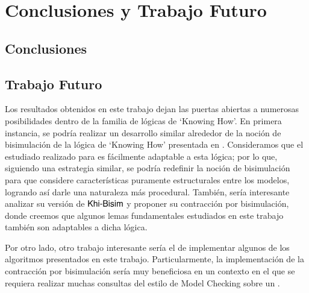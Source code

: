 \chapter{Conclusiones y Trabajo Futuro}

\section{Conclusiones}


\section{Trabajo Futuro}

Los resultados obtenidos en este trabajo dejan las puertas abiertas a numerosas posibilidades dentro de la familia de lógicas de `Knowing How'. 
En primera instancia, se podría realizar un desarrollo similar alrededor de la noción de bisimulación de la lógica de `Knowing How' presentada 
en \cite{Wang15KH,Wang2018GoalDirectedKH}. Consideramos que el estudiado realizado para \KHilogic es fácilmente adaptable a esta lógica; por lo que, siguiendo 
una estrategia similar, se podría redefinir la noción de bisimulación para que considere características puramente estructurales entre los modelos, 
logrando así darle una naturaleza más procedural. También, sería interesante analizar su versión de $\rm\textsf{Khi-Bisim}$ y proponer su contracción 
por bisimulación, donde creemos que algunos lemas fundamentales estudiados en este trabajo también son adaptables a dicha lógica.

Por otro lado, otro trabajo interesante sería el de implementar algunos de los algoritmos presentados en este trabajo. Particularmente, 
la implementación de la contracción por bisimulación sería muy beneficiosa en un contexto en el que se requiera realizar muchas consultas del 
estilo de Model Checking sobre un \ults.

